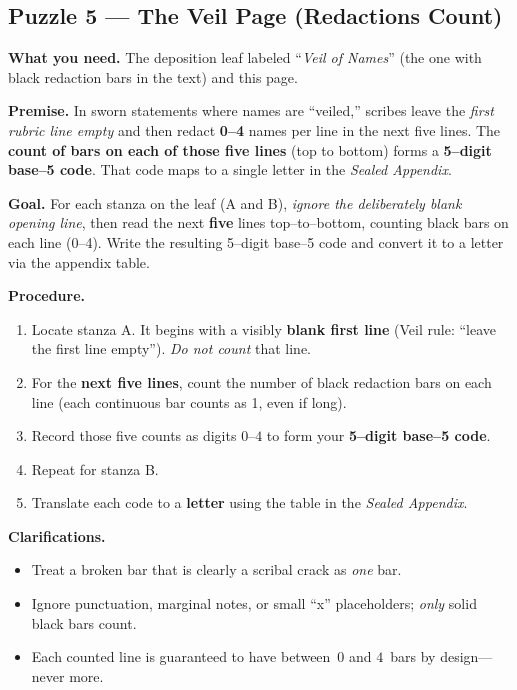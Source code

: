 \documentclass[11pt]{article}
\numberwithin{equation}{section} %
\theoremstyle{plain} %
\theoremstyle{definition} %
\theoremstyle{remark} %
\begin{document}
\subsection{Puzzle 5 — The Veil Page (Redactions Count)}
\label{pz:veil-page}

\noindent\textbf{What you need.} The deposition leaf labeled “\textit{Veil of Names}” (the one with black redaction bars in the text) and this page.

\medskip
\noindent\textbf{Premise.} In sworn statements where names are “veiled,” scribes leave the \emph{first rubric line empty} and then redact \textbf{0–4} names per line in the next five lines. The \textbf{count of bars on each of those five lines} (top to bottom) forms a \textbf{5–digit base–5 code}. That code maps to a single letter in the \emph{Sealed Appendix}.

\medskip
\noindent\textbf{Goal.} For each stanza on the leaf (\textsc{A} and \textsc{B}), \emph{ignore the deliberately blank opening line}, then read the next \textbf{five} lines top–to–bottom, counting black bars on each line (0–4). Write the resulting 5–digit base–5 code and convert it to a letter via the appendix table.

\medskip
\noindent\textbf{Procedure.}
\begin{enumerate}\setlength\itemsep{0.2em}
  \item Locate stanza \textsc{A}. It begins with a visibly \textbf{blank first line} (Veil rule: “leave the first line empty”). \emph{Do not count} that line.
  \item For the \textbf{next five lines}, count the number of black redaction bars on each line (each continuous bar counts as 1, even if long).
  \item Record those five counts as digits \(0\)–\(4\) to form your \textbf{5–digit base–5 code}.
  \item Repeat for stanza \textsc{B}.
  \item Translate each code to a \textbf{letter} using the table in the \emph{Sealed Appendix}.
\end{enumerate}

\medskip
\noindent\textbf{Clarifications.}
\begin{itemize}\setlength\itemsep{0.25em}
  \item Treat a broken bar that is clearly a scribal crack as \emph{one} bar.
  \item Ignore punctuation, marginal notes, or small “x” placeholders; \emph{only} solid black bars count.
  \item Each counted line is guaranteed to have between \(\,0\) and \(4\,\) bars by design—never more.
\end{itemize}
\end{document}
